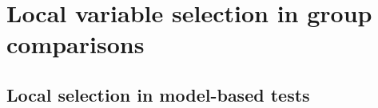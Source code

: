 








\section{Local variable selection in group comparisons}
\label{sec:single_covar}


\subsection{Local selection in model-based tests}
\label{ssec:model}

